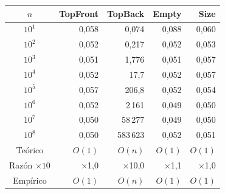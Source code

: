 \begin{tabular}{crrrr}
\toprule
$n$ & \textbf{TopFront} & \textbf{TopBack} & \textbf{Empty} & \textbf{Size} \\
\midrule
$10^{1}$ & 0{,}058 & 0{,}074 & 0{,}088 & 0{,}060 \\
$10^{2}$ & 0{,}052 & 0{,}217 & 0{,}052 & 0{,}053 \\
$10^{3}$ & 0{,}051 & 1{,}776 & 0{,}051 & 0{,}057 \\
$10^{4}$ & 0{,}052 & 17{,}7 & 0{,}052 & 0{,}057 \\
$10^{5}$ & 0{,}057 & 206{,}8 & 0{,}052 & 0{,}054 \\
$10^{6}$ & 0{,}052 & 2\,161 & 0{,}049 & 0{,}050 \\
$10^{7}$ & 0{,}050 & 58\,277 & 0{,}049 & 0{,}050 \\
$10^{8}$ & 0{,}050 & 583\,623 & 0{,}052 & 0{,}051 \\
\midrule
Teórico & $O(1)$ & $O(n)$ & $O(1)$ & $O(1)$ \\
Razón $\times 10$ & $\times$1{,}0 & $\times$10{,}0 & $\times$1{,}1 & $\times$1{,}0 \\
Empírico & $O(1)$ & $O(n)$ & $O(1)$ & $O(1)$ \\
\bottomrule
\end{tabular}